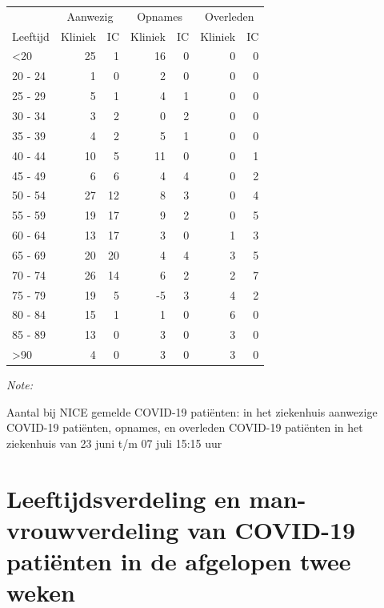 \documentclass[
  english,
  man,floatsintext]{apa6}
\begin{document}
\begin{table}
\centering\begingroup\fontsize{10}{12}\selectfont

\begin{threeparttable}
\begin{tabular}{lrrrrrr}
\toprule
\multicolumn{1}{c}{ } & \multicolumn{2}{c}{Aanwezig} & \multicolumn{2}{c}{Opnames} & \multicolumn{2}{c}{Overleden} \\
\cmidrule(l{3pt}r{3pt}){2-3} \cmidrule(l{3pt}r{3pt}){4-5} \cmidrule(l{3pt}r{3pt}){6-7}
Leeftijd & Kliniek & IC & Kliniek & IC & Kliniek & IC\\
\midrule
<20 & 25 & 1 & 16 & 0 & 0 & 0\\
20 - 24 & 1 & 0 & 2 & 0 & 0 & 0\\
25 - 29 & 5 & 1 & 4 & 1 & 0 & 0\\
30 - 34 & 3 & 2 & 0 & 2 & 0 & 0\\
35 - 39 & 4 & 2 & 5 & 1 & 0 & 0\\
40 - 44 & 10 & 5 & 11 & 0 & 0 & 1\\
45 - 49 & 6 & 6 & 4 & 4 & 0 & 2\\
50 - 54 & 27 & 12 & 8 & 3 & 0 & 4\\
55 - 59 & 19 & 17 & 9 & 2 & 0 & 5\\
60 - 64 & 13 & 17 & 3 & 0 & 1 & 3\\
65 - 69 & 20 & 20 & 4 & 4 & 3 & 5\\
70 - 74 & 26 & 14 & 6 & 2 & 2 & 7\\
75 - 79 & 19 & 5 & -5 & 3 & 4 & 2\\
80 - 84 & 15 & 1 & 1 & 0 & 6 & 0\\
85 - 89 & 13 & 0 & 3 & 0 & 3 & 0\\
>90 & 4 & 0 & 3 & 0 & 3 & 0\\
\bottomrule
\end{tabular}
\begin{tablenotes}
\item \textit{Note: } 
\item Aantal bij NICE gemelde COVID-19 patiënten: in het ziekenhuis aanwezige COVID-19 patiënten, opnames, en overleden COVID-19 patiënten in het ziekenhuis van 23 juni t/m 07 juli 15:15 uur
\end{tablenotes}
\end{threeparttable}
\endgroup{}
\end{table}

\newpage

\hypertarget{leeftijdsverdeling-en-man-vrouwverdeling-van-covid-19-patiuxebnten-in-de-afgelopen-twee-weken}{%
\section{Leeftijdsverdeling en man-vrouwverdeling van COVID-19 patiënten in de afgelopen twee weken}\label{leeftijdsverdeling-en-man-vrouwverdeling-van-covid-19-patiuxebnten-in-de-afgelopen-twee-weken}}
\end{document}
